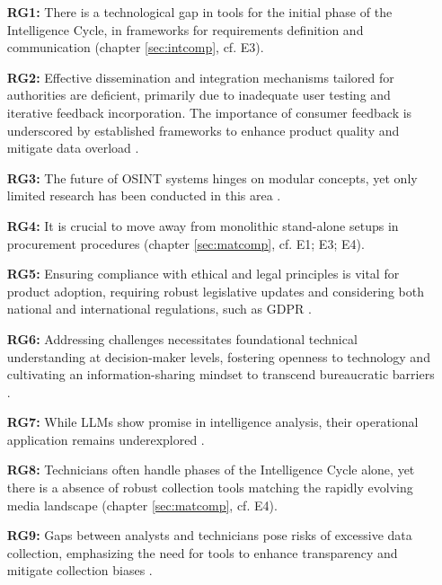 \documentclass[10pt]{article}
\begin{document}
\begin{itemize}
    \item[\textbf{RG1:}] There is a technological gap in tools for the initial phase of the Intelligence Cycle, in frameworks for requirements definition and communication (chapter \ref{sec:intcomp}, cf. E3).

        \item[\textbf{RG2:}]Effective dissemination and integration mechanisms tailored for authorities are deficient, primarily due to inadequate user testing and iterative feedback incorporation. The importance of consumer feedback is underscored by established frameworks to enhance product quality and mitigate data overload \cite{JointChiefsofStaffU.S.Army.2013, NorthAtlanticTreatyOrganization.2001}.

    \item[\textbf{RG3:}] The future of OSINT systems hinges on modular concepts, yet only limited research has been conducted in this area \cite{Arjun.2020,Wright.2020}.

    \item[\textbf{RG4:}] It is crucial to move away from monolithic stand-alone setups in procurement procedures (chapter \ref{sec:matcomp}, cf. E1; E3; E4).

    \item[\textbf{RG5:}] Ensuring compliance with ethical and legal principles is vital for product adoption, requiring robust legislative updates and considering both national and international regulations, such as GDPR \cite{EuropeanParliament.2016,EuropeanCommission.18.08.2023,Wittmer.2022}.

    \item[\textbf{RG6:}] Addressing challenges necessitates foundational technical understanding at decision-maker levels, fostering openness to technology and cultivating an information-sharing mindset to transcend bureaucratic barriers \cite{NorthAtlanticTreatyOrganization.2001}.

    \item[\textbf{RG7:}] While LLMs show promise in intelligence analysis, their operational application remains underexplored \cite{Radford.2023}.

    \item[\textbf{RG8:}] Technicians often handle phases of the Intelligence Cycle alone, yet there is a absence of robust collection tools matching the rapidly evolving media landscape (chapter \ref{sec:matcomp}, cf. E4).

    \item[\textbf{RG9:}] Gaps between analysts and technicians pose risks of excessive data collection, emphasizing the need for tools to enhance transparency and mitigate collection biases \cite{Lowenthal.2020}.
\end{itemize}
\end{document}
